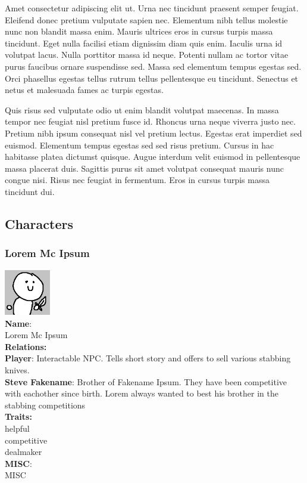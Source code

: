 \documentclass[10pt,a4paper]{article}
\begin{document}
Amet consectetur adipiscing elit ut. Urna nec tincidunt praesent semper feugiat. Eleifend donec pretium vulputate sapien nec. Elementum nibh tellus molestie nunc non blandit massa enim. Mauris ultrices eros in cursus turpis massa tincidunt. Eget nulla facilisi etiam dignissim diam quis enim. Iaculis urna id volutpat lacus. Nulla porttitor massa id neque. Potenti nullam ac tortor vitae purus faucibus ornare suspendisse sed. Massa sed elementum tempus egestas sed. Orci phasellus egestas tellus rutrum tellus pellentesque eu tincidunt. Senectus et netus et malesuada fames ac turpis egestas.

Quis risus sed vulputate odio ut enim blandit volutpat maecenas. In massa tempor nec feugiat nisl pretium fusce id. Rhoncus urna neque viverra justo nec. Pretium nibh ipsum consequat nisl vel pretium lectus. Egestas erat imperdiet sed euismod. Elementum tempus egestas sed sed risus pretium. Cursus in hac habitasse platea dictumst quisque. Augue interdum velit euismod in pellentesque massa placerat duis. Sagittis purus sit amet volutpat consequat mauris nunc congue nisi. Risus nec feugiat in fermentum. Eros in cursus turpis massa tincidunt dui.


\subsection{Characters}
\subsubsection{Lorem Mc Ipsum}
\label{BOSS1}
\begin{center}
\includegraphics[width=2cm]{chartest} \\
\textbf{Name}:\\
Lorem Mc Ipsum\\
\textbf{Relations:}\\
\textbf{Player}: Interactable NPC. Tells short story and offers to sell various stabbing knives. \\
\textbf{Steve Fakename}: Brother of Fakename Ipsum. They have been competitive with eachother since birth. Lorem always wanted to best his brother in the stabbing competitions \\
\textbf{Traits:}\\
helpful\\
competitive\\
dealmaker\\
\textbf{MISC}:\\
MISC
\end{center}
\end{document}
